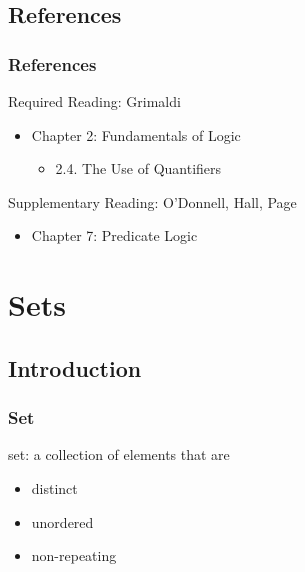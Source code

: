 \documentclass[dvipsnames]{beamer}
\begin{document}
\subsection*{References}

\begin{frame}
  \frametitle{References}

  \begin{block}{Required Reading: Grimaldi}
    \begin{itemize}
      \item Chapter 2: Fundamentals of Logic
      \begin{itemize}
        \item 2.4. \alert{The Use of Quantifiers}
      \end{itemize}
    \end{itemize}
  \end{block}

  \begin{block}{Supplementary Reading: O'Donnell, Hall, Page}
    \begin{itemize}
      \item Chapter 7: Predicate Logic
    \end{itemize}
  \end{block}
\end{frame}

\section{Sets}

\subsection{Introduction}

\begin{frame}
  \frametitle{Set}

  \begin{definition}
    \alert{set}: a collection of elements that are
    \begin{itemize}
      \item distinct
      \item unordered
      \item non-repeating
    \end{itemize}
  \end{definition}
\end{frame}
\end{document}
